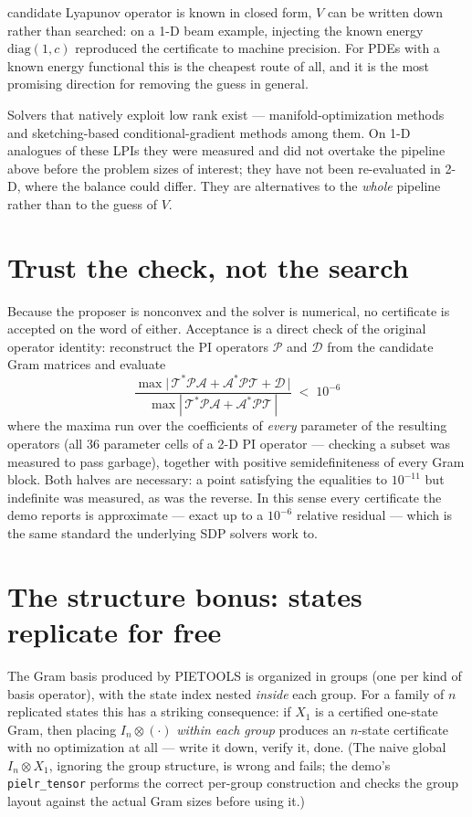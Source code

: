 \documentclass[11pt]{article}
\newcommand{\T}{\mathcal{T}}
\newcommand{\A}{\mathcal{A}}
\newcommand{\PP}{\mathcal{P}}
\newcommand{\D}{\mathcal{D}}
\begin{document}
\begin{description}
  candidate Lyapunov operator is known in closed form, $V$ can be written
  down rather than searched: on a 1-D beam example, injecting the known
  energy $\mathrm{diag}(1,c)$ reproduced the certificate to machine
  precision. For PDEs with a known energy functional this is the cheapest
  route of all, and it is the most promising direction for removing the
  guess in general.
\item[Purpose-built low-rank SDP solvers.] Solvers that natively exploit
  low rank exist --- manifold-optimization methods and sketching-based
  conditional-gradient methods among them. On 1-D analogues of these LPIs
  they were measured and did not overtake the pipeline above before the
  problem sizes of interest; they have not been re-evaluated in 2-D, where
  the balance could differ. They are alternatives to the \emph{whole}
  pipeline rather than to the guess of $V$.
\end{description}

\section{Trust the check, not the search}\label{sec:verify}

Because the proposer is nonconvex and the solver is numerical, no certificate
is accepted on the word of either. Acceptance is a direct check of the
original operator identity: reconstruct the PI operators $\PP$ and $\D$ from
the candidate Gram matrices and evaluate
\[
\frac{\max\bigl|\,\T^{*}\PP\A+\A^{*}\PP\T+\D\,\bigr|}
     {\max|\,\T^{*}\PP\A+\A^{*}\PP\T\,|}\;<\;10^{-6}
\]
where the maxima run over the coefficients of \emph{every} parameter of the
resulting operators (all 36 parameter cells of a 2-D PI operator --- checking
a subset was measured to pass garbage), together with positive
semidefiniteness of every Gram block. Both halves are necessary: a point
satisfying the equalities to $10^{-11}$ but indefinite was measured, as was
the reverse. In this sense every certificate the demo reports is
approximate --- exact up to a $10^{-6}$ relative residual --- which is the
same standard the underlying SDP solvers work to.

\section{The structure bonus: states replicate for free}

The Gram basis produced by PIETOOLS is organized in groups (one per kind of
basis operator), with the state index nested \emph{inside} each group. For a
family of $n$ replicated states this has a striking consequence: if $X_1$ is
a certified one-state Gram, then placing $I_n\otimes(\cdot)$ \emph{within
each group} produces an $n$-state certificate with no optimization at all ---
write it down, verify it, done. (The naive global $I_n\otimes X_1$, ignoring
the group structure, is wrong and fails; the demo's \texttt{pielr\_tensor}
performs the correct per-group construction and checks the group layout
against the actual Gram sizes before using it.)
\end{document}
